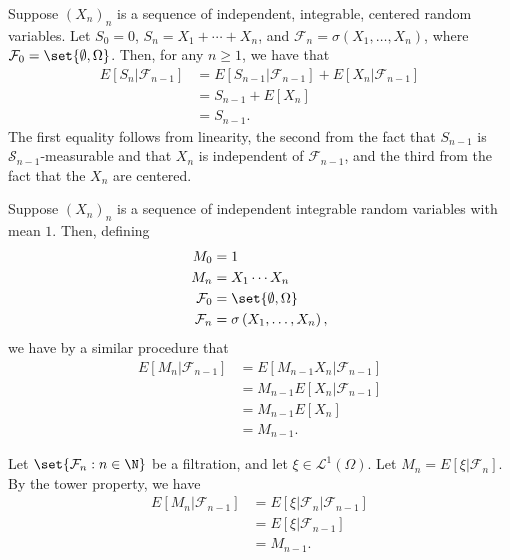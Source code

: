 \documentclass[10pt]{mypackage}
\begin{document}
\begin{example}
  Suppose $\left( X_n \right)_n$ is a sequence of independent, integrable, centered random variables. Let $S_0 = 0$, $S_n = X_1 + \cdots + X_n$, and $\mathcal{F}_n = \sigma\left( X_1,\dots,X_n \right)$, where $\mathcal{F}_0 = \set{\emptyset,\Omega}$. Then, for any $n\geq 1$, we have that
  \begin{align*}
    E\left[ S_n|\mathcal{F}_{n-1} \right] &= E\left[ S_{n-1}|\mathcal{F}_{n-1} \right] + E\left[ X_n|\mathcal{F}_{n-1} \right]\\
                                          &= S_{n-1} + E\left[ X_n \right]\\
                                          &= S_{n-1}.
  \end{align*}
  The first equality follows from linearity, the second from the fact that $S_{n-1}$ is $\mathcal{S}_{n-1}$-measurable and that $X_n$ is independent of $\mathcal{F}_{n-1}$, and the third from the fact that the $X_n$ are centered.
\end{example}
\begin{example}
  Suppose $\left( X_n \right)_n$ is a sequence of independent integrable random variables with mean $1$. Then, defining
  \begin{align*}
    M_0 &= 1\\
    M_n &= X_1\cdots X_n\\
    \mathcal{F}_0 &= \set{\emptyset,\Omega}\\
    \mathcal{F}_n &= \sigma\left( X_1,\dots,X_n \right),
  \end{align*}
  we have by a similar procedure that
  \begin{align*}
    E\left[ M_n|\mathcal{F}_{n-1} \right] &= E\left[ M_{n-1}X_n|\mathcal{F}_{n-1} \right]\\
                                          &= M_{n-1}E\left[ X_n|\mathcal{F}_{n-1} \right]\\
                                          &= M_{n-1}E\left[ X_n \right]\\
                                          &= M_{n-1}.
  \end{align*}
\end{example}
\begin{example}
  Let $\set{\mathcal{F}_n : n\in \N}$ be a filtration, and let $\xi\in \mathcal{L}^1\left( \Omega \right)$. Let $M_n = E\left[ \xi| \mathcal{F}_n \right]$. By the tower property, we have
  \begin{align*}
    E\left[ M_n|\mathcal{F}_{n-1} \right] &= E\left[ \xi|\mathcal{F}_n|\mathcal{F}_{n-1} \right]\\
                                          &= E\left[ \xi|\mathcal{F}_{n-1} \right]\\
                                          &= M_{n-1}.
  \end{align*}
\end{example}
\end{document}
